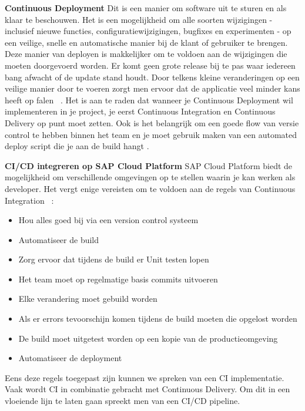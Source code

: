 \large{\textbf{Continuous Deployment}}
\newline
Dit is een manier om software uit te sturen en als klaar te beschouwen. Het is een mogelijkheid om alle soorten wijzigingen - inclusief nieuwe functies, configuratiewijzigingen, bugfixes en experimenten - op een veilige, snelle en automatische manier bij de klant of gebruiker te brengen. 
Deze manier van deployen is makkelijker om te voldoen aan de wijzigingen die moeten doorgevoerd worden. Er komt geen grote release bij te pas waar iedereen bang afwacht of de update stand houdt. Door telkens kleine veranderingen op een veilige manier door te voeren zorgt men ervoor dat de applicatie veel minder kans heeft op falen ~\autocite{Claps2015}.
Het is aan te raden dat wanneer je Continuous Deployment wil implementeren in je project, je eerst Continuous Integration en Continuous Delivery op punt moet zetten. 
Ook is het belangrijk om een goede flow van versie control te hebben binnen het team en je moet gebruik maken van een automated deploy script die je aan de build hangt . 


\large{\textbf{CI/CD integreren op SAP Cloud Platform}}
\newline{}
SAP Cloud Platform biedt de mogelijkheid om verschillende omgevingen op te stellen waarin je kan werken als developer. Het vergt enige vereisten om te voldoen aan de regels van Continuous Integration ~\autocite{Kramer2018}:
\begin{itemize}
    \item Hou alles goed bij via een version control systeem
    \item Automatiseer de build
    \item Zorg ervoor dat tijdens de build er Unit testen lopen
    \item Het team moet op regelmatige basis commits uitvoeren
    \item Elke verandering moet gebuild worden
    \item Als er errors tevoorschijn komen tijdens de build moeten die opgelost worden
    \item De build moet uitgetest worden op een kopie van de productieomgeving
    \item Automatiseer de deployment
\end{itemize}
Eens deze regels toegepast zijn kunnen we spreken van een CI implementatie.
Vaak wordt CI in combinatie gebracht met Continuous Delivery. Om dit in een vloeiende lijn te laten gaan spreekt men van een CI/CD pipeline.

